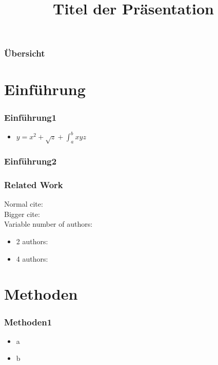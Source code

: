 \documentclass[student]{LSRslides}
\title{Titel der Präsentation}
\begin{document}
\begin{frame}
    \titlepage
\end{frame}

\begin{frame}
    \frametitle{Übersicht}
    \tableofcontents%
\end{frame}

\section{Einführung}

\begin{frame}
	\frametitle{Einführung1}
	\begin{itemize}
 		\item $y=x^2+\sqrt{z}+\int_{a}^{b}{xyz}$
	\end{itemize}
\end{frame}

\begin{frame}
	\frametitle{Einführung2}


\end{frame}

\begin{frame}
	\frametitle{Related Work}
	Normal cite: \cite{buss11}\\
	Bigger cite: \\
	Variable number of authors: 
	\begin{itemize}
		\item 2 authors: 
		\item 4 authors: 
	\end{itemize}
\end{frame}

\section{Methoden}

\begin{frame}
	\frametitle{Methoden1}
	\begin{itemize}
		\item a
		\item b
	\end{itemize}
\end{frame}
\end{document}
